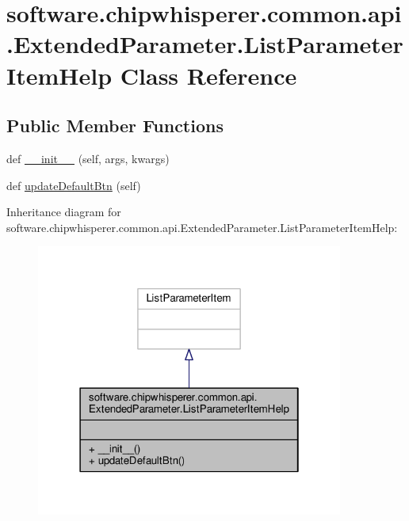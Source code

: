 \hypertarget{classsoftware_1_1chipwhisperer_1_1common_1_1api_1_1ExtendedParameter_1_1ListParameterItemHelp}{}\section{software.\+chipwhisperer.\+common.\+api.\+Extended\+Parameter.\+List\+Parameter\+Item\+Help Class Reference}
\label{classsoftware_1_1chipwhisperer_1_1common_1_1api_1_1ExtendedParameter_1_1ListParameterItemHelp}
\subsection*{Public Member Functions}
\begin{DoxyCompactItemize}
\item 
def \hyperlink{classsoftware_1_1chipwhisperer_1_1common_1_1api_1_1ExtendedParameter_1_1ListParameterItemHelp_adf3521741f290d1d9c968c48c76982f8}{\+\_\+\+\_\+init\+\_\+\+\_\+} (self, args, kwargs)
\item 
def \hyperlink{classsoftware_1_1chipwhisperer_1_1common_1_1api_1_1ExtendedParameter_1_1ListParameterItemHelp_a9b4ce30505ccf213ec2fe7ccf8f031f7}{update\+Default\+Btn} (self)
\end{DoxyCompactItemize}


Inheritance diagram for software.\+chipwhisperer.\+common.\+api.\+Extended\+Parameter.\+List\+Parameter\+Item\+Help\+:\nopagebreak
\begin{figure}[H]
\begin{center}
\leavevmode
\includegraphics[width=286pt]{d3/d74/classsoftware_1_1chipwhisperer_1_1common_1_1api_1_1ExtendedParameter_1_1ListParameterItemHelp__inherit__graph}
\end{center}
\end{figure}


